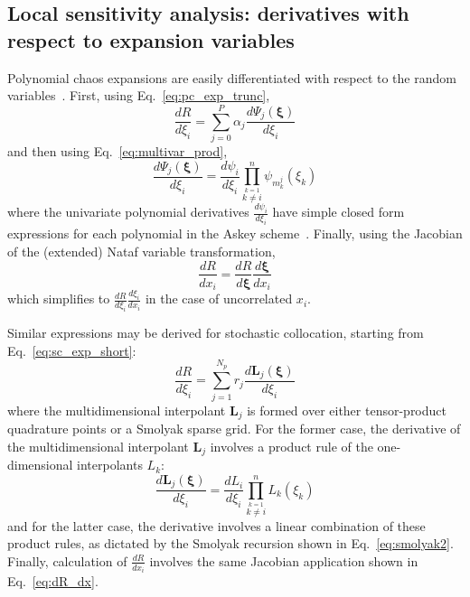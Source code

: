 \subsection{Local sensitivity analysis: derivatives with respect to expansion variables} \label{uq:expansion:rvsa}

Polynomial chaos expansions are easily differentiated with respect to
the random variables~\cite{reagan_sens}.  First, using
Eq.~\ref{eq:pc_exp_trunc},
\begin{equation}
\frac{dR}{d\xi_i} = \sum_{j=0}^P \alpha_j 
\frac{d\Psi_j(\boldsymbol{\xi})}{d\xi_i}\label{eq:dR_dxi_pce}
\end{equation}
and then using Eq.~\ref{eq:multivar_prod}, 
\begin{equation}
\frac{d\Psi_j(\boldsymbol{\xi})}{d\xi_i} = \frac{d\psi_i}{d\xi_i}
\prod_{\stackrel{\scriptstyle k=1}{k \ne i}}^n \psi_{m_k^j}(\xi_k)
\label{eq:deriv_prod_pce}
\end{equation}
where the univariate polynomial derivatives $\frac{d\psi_i}{d\xi_i}$
have simple closed form expressions for each polynomial in the Askey
scheme~\cite{abram_stegun}.  Finally, using the Jacobian of the
(extended) Nataf variable transformation,
\begin{equation}
\frac{dR}{dx_i} = \frac{dR}{d\boldsymbol{\xi}} 
\frac{d\boldsymbol{\xi}}{dx_i} \label{eq:dR_dx}
\end{equation}
which simplifies to $\frac{dR}{d\xi_i} \frac{d\xi_i}{dx_i}$ in the
case of uncorrelated $x_i$.  

Similar expressions may be derived for stochastic collocation, starting
from Eq.~\ref{eq:sc_exp_short}:
\begin{equation}
\frac{dR}{d\xi_i} = \sum_{j=1}^{N_p} r_j 
\frac{d\boldsymbol{L}_j(\boldsymbol{\xi})}{d\xi_i}\label{eq:dR_dxi_sc}
\end{equation}
where the multidimensional interpolant $\boldsymbol{L}_j$ is formed
over either tensor-product quadrature points or a Smolyak sparse grid.
For the former case, the derivative of the multidimensional
interpolant $\boldsymbol{L}_j$ involves a product rule of the
one-dimensional interpolants $L_k$:
\begin{equation}
\frac{d\boldsymbol{L}_j(\boldsymbol{\xi})}{d\xi_i} = \frac{dL_i}{d\xi_i}
\prod_{\stackrel{\scriptstyle k=1}{k \ne i}}^n L_k(\xi_k)
\label{eq:deriv_prod_sc}
\end{equation}
and for the latter case, the derivative involves a linear combination
of these product rules, as dictated by the Smolyak recursion shown in
Eq.~\ref{eq:smolyak2}.  Finally, calculation of $\frac{dR}{dx_i}$
involves the same Jacobian application shown in Eq.~\ref{eq:dR_dx}.

